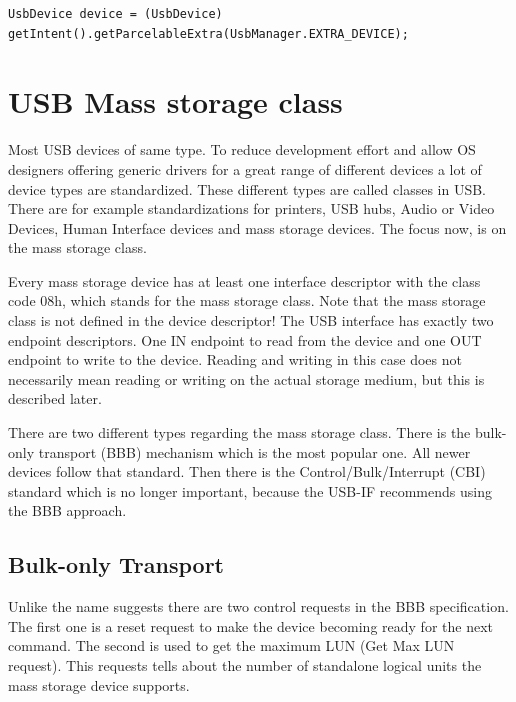 \lstset{language=Java}
\begin{lstlisting}[caption={Accessing the UsbDevice in the Activity, compare to: \cite{android_usb_host}}, label=listing:access_usb_dev_activity]
UsbDevice device = (UsbDevice) getIntent().getParcelableExtra(UsbManager.EXTRA_DEVICE);
\end{lstlisting}

\chapter{USB Mass storage class}

Most USB devices of same type. To reduce development effort and allow OS designers offering generic drivers for a great range of different devices a lot of device types are standardized. These different types are called classes in USB. There are for example standardizations for printers, USB hubs, Audio or Video Devices, Human Interface devices and mass storage devices\cite{usb_classes}. The focus now, is on the mass storage class.

Every mass storage device has at least one interface descriptor with the class code 08h, which stands for the mass storage class. Note that the mass storage class is not defined in the device descriptor! The USB interface has exactly two endpoint descriptors. One IN endpoint to read from the device and one OUT endpoint to write to the device\cite{usb_ms_jan}. Reading and writing in this case does not necessarily mean reading or writing on the actual storage medium, but this is described later.

There are two different types regarding the mass storage class. There is the bulk-only transport (BBB) mechanism which is the most popular one. All newer devices follow that standard. Then there is the Control/Bulk/Interrupt (CBI) standard which is no longer important, because the USB-IF recommends using the BBB approach\cite{usb_ms_jan}.

\section{Bulk-only Transport}

Unlike the name suggests there are two control requests in the BBB specification. The first one is a reset request to make the device becoming ready for the next command. The second is used to get the maximum LUN (Get Max LUN request). This requests tells about the number of standalone logical units the mass storage device supports\cite{usb_ms_jan}.

